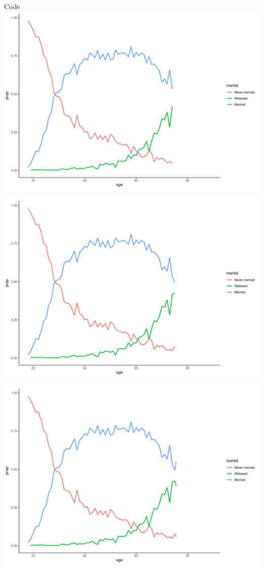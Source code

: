 \documentclass[
  ignorenonframetext,
]{beamer}
\begin{document}
\begin{frame}[fragile]{Code}
\includegraphics{gss_cat_files/figure-beamer/unnamed-chunk-1-83.pdf}

\includegraphics{gss_cat_files/figure-beamer/unnamed-chunk-1-84.pdf}

\includegraphics{gss_cat_files/figure-beamer/unnamed-chunk-1-85.pdf}


\end{frame}
\end{document}
